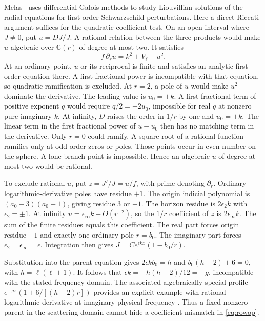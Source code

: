 \documentclass[11pt]{article}
\begin{document}
Melas~\cite{melas} uses differential Galois methods to study Liouvillian solutions of the radial equations for first-order Schwarzschild perturbations.
Here a direct Riccati argument suffices for the quadratic coefficient test.
On an open interval where \(J\ne0\), put \(u=DJ/J\).
A rational relation between the three products would make \(u\) algebraic over \(\mathbb C(r)\) of degree at most two.
It satisfies
\begin{equation}
 f\,\partial_r u=k^2+V_\ell-u^2 .
 \label{eq:riccati}
\end{equation}
At an ordinary point, \(u\) or its reciprocal is finite and satisfies an analytic first-order equation there.
A first fractional power is incompatible with that equation, so quadratic ramification is excluded.
At \(r=2\), a pole of \(u\) would make \(u^2\) dominate the derivative.
The leading value is \(u_0=\pm k\).
A first fractional term of positive exponent \(q\) would require \(q/2=-2u_0\), impossible for real \(q\) at nonzero pure imaginary \(k\).
At infinity, \(D\) raises the order in \(1/r\) by one and \(u_0=\pm k\).
The linear term in the first fractional power of \(u-u_0\) then has no matching term in the derivative.
Only \(r=0\) could ramify.
A square root of a rational function ramifies only at odd-order zeros or poles. Those points occur in even number on the sphere.
A lone branch point is impossible. Hence an algebraic \(u\) of degree at most two would be rational.

To exclude rational \(u\), put \(z=J'/J=u/f\), with prime denoting \(\partial_r\).
Ordinary logarithmic-derivative poles have residue \(+1\).
The origin indicial polynomial is \((a_0-3)(a_0+1)\), giving residue \(3\) or \(-1\).
The horizon residue is \(2\epsilon_2 k\) with \(\epsilon_2=\pm1\).
At infinity \(u=\epsilon_\infty k+O(r^{-2})\), so the \(1/r\) coefficient of \(z\) is \(2\epsilon_\infty k\).
The sum of the finite residues equals this coefficient.
The real part forces origin residue \(-1\) and exactly one ordinary pole \(r=b_0\).
The imaginary part forces \(\epsilon_2=\epsilon_\infty=\epsilon\).
Integration then gives \(J=C e^{\epsilon kx}(1-b_0/r)\).

Substitution into the parent equation gives \(2\epsilon k b_0=h\) and \(b_0(h-2)+6=0\), with \(h=\ell(\ell+1)\).
It follows that \(\epsilon k=-h(h-2)/12=-g\), incompatible with the stated frequency domain.
The associated algebraically special profile \(e^{-gx}(1+6/[(h-2)r])\) provides an explicit example with rational logarithmic derivative at imaginary physical frequency \cite{special}.
Thus a fixed nonzero parent in the scattering domain cannot hide a coefficient mismatch in \eqref{eq:rowop}.
\end{document}
